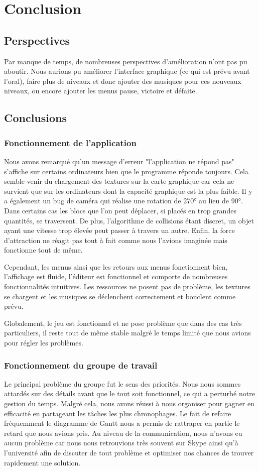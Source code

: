\chapter{Conclusion}
	\section{Perspectives}
		Par manque de temps, de nombreuses perspectives d'amélioration n'ont pas pu aboutir. Nous aurions pu améliorer l'interface graphique (ce qui est prévu avant l'oral), faire plus de niveaux et donc ajouter des musiques pour ces nouveaux niveaux, ou encore ajouter les menus pause, victoire et défaite.
	\section{Conclusions}
		\subsection{Fonctionnement de l'application}
			Nous avons remarqué qu'un message d'erreur "l'application ne répond pas" s'affiche sur certains ordinateurs bien que le programme réponde toujours. Cela semble venir du chargement des textures sur la carte graphique car cela ne survient que sur les ordinateurs dont la capacité graphique est la plus faible. Il y a également un bug de caméra qui réalise une rotation de 270° au lieu de 90°. Dans certains cas les blocs que l'on peut déplacer, si placés en trop grandes quantités, se traversent. De plus, l'algorithme de collisions étant discret, un objet ayant une vitesse trop élevée peut passer à travers un autre. Enfin, la force d'attraction ne réagit pas tout à fait comme nous l'avions imaginée mais fonctionne tout de même.

			Cependant, les menus ainsi que les retours aux menus fonctionnent bien, l'affichage est fluide, l'éditeur est fonctionnel et comporte de nombreuses fonctionnalités intuitives. Les ressources ne posent pas de problème, les textures se chargent et les musiques se déclenchent correctement et bouclent comme prévu.

			Globalement, le jeu est fonctionnel et ne pose problème que dans des cas très particuliers, il reste tout de même stable malgré le temps limité que nous avions pour régler les problèmes.

		\subsection{Fonctionnement du groupe de travail}
			Le principal problème du groupe fut le sens des priorités. Nous nous sommes attardés sur des détails avant que le tout soit fonctionnel, ce qui a perturbé notre gestion du temps. Malgré cela, nous avons réussi à nous organiser pour gagner en efficacité en partageant les tâches les plus chronophages. Le fait de refaire fréquemment le diagramme de Gantt nous a permis de rattraper en partie le retard que nous avions pris. Au niveau de la communication, nous n'avons eu aucun problème car nous nous retrouvions très souvent sur Skype ainsi qu'à l'université afin de discuter de tout problème et optimiser nos chances de trouver rapidement une solution.

